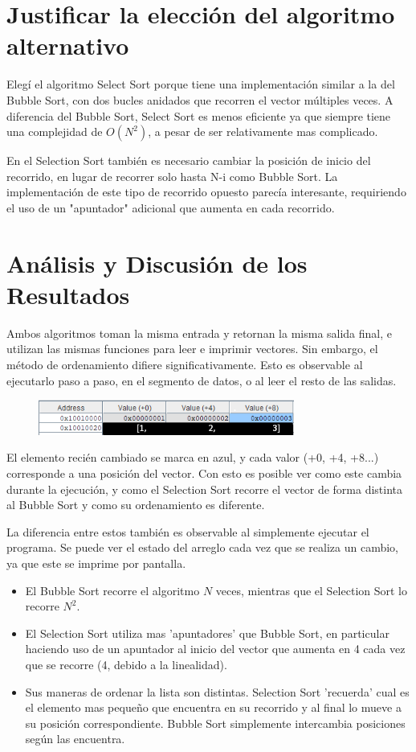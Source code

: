 \documentclass[titlepage]{article}
\begin{document}
\section*{Justificar la elección del algoritmo alternativo}

Elegí el algoritmo Select Sort porque tiene una implementación similar a la del Bubble Sort, con dos bucles anidados que recorren el vector múltiples veces. A diferencia del Bubble Sort, Select Sort es menos eficiente ya que siempre tiene una complejidad de $O(N^2)$, a pesar de ser relativamente mas complicado.

En el Selection Sort también es necesario cambiar la posición de inicio del recorrido, en lugar de recorrer solo hasta N-i como Bubble Sort. La implementación de este tipo de recorrido opuesto parecía interesante, requiriendo el uso de un "apuntador" adicional que aumenta en cada recorrido.

\section{Análisis y Discusión de los Resultados}

Ambos algoritmos toman la misma entrada y retornan la misma salida final, e utilizan las mismas funciones para leer e imprimir vectores. Sin embargo, el método de ordenamiento difiere significativamente. Esto es observable al ejecutarlo paso a paso, en el segmento de datos, o al leer el resto de las salidas.

\begin{figure}[ht]
    \centering
    \includegraphics[width=0.75\textwidth]{images/step5.png} %
    \label{fig:step5}
\end{figure}

El elemento recién cambiado se marca en azul, y cada valor (+0, +4, +8...) corresponde a una posición del vector. Con esto es posible ver como este cambia durante la ejecución, y como el Selection Sort recorre el vector de forma distinta al Bubble Sort y como su ordenamiento es diferente.

La diferencia entre estos también es observable al simplemente ejecutar el programa. Se puede ver el estado del arreglo cada vez que se realiza un cambio, ya que este se imprime por pantalla.

\begin{itemize}
    \item El Bubble Sort recorre el algoritmo $N$ veces, mientras que el Selection Sort lo recorre $N^2$.
    \item El Selection Sort utiliza mas 'apuntadores' que Bubble Sort, en particular haciendo uso de un apuntador al inicio del vector que aumenta en 4 cada vez que se recorre (4, debido a la linealidad).
    \item Sus maneras de ordenar la lista son distintas. Selection Sort 'recuerda' cual es el elemento mas pequeño que encuentra en su recorrido y al final lo mueve a su posición correspondiente. Bubble Sort simplemente intercambia posiciones según las encuentra.
\end{itemize}
\end{document}

